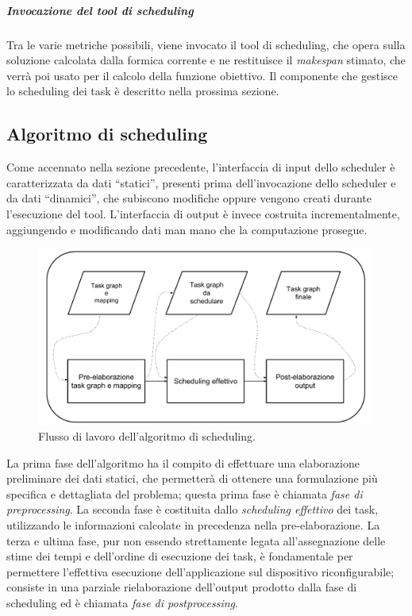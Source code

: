 \subparagraph{Invocazione del tool di scheduling}
Tra le varie metriche possibili, viene invocato il tool di scheduling, che opera sulla
soluzione calcolata dalla formica corrente e ne restituisce il \emph{makespan} stimato,
che verr\`a poi usato per il calcolo della funzione obiettivo. Il componente che gestisce lo scheduling
dei task \`e descritto nella prossima sezione.

\subsection{Algoritmo di scheduling}
\label{subsec:algoScheduling}
Come accennato nella sezione precedente, l'interfaccia di input dello scheduler è 
caratterizzata da dati ``statici'', presenti prima dell'invocazione dello 
scheduler e da dati ``dinamici'', che subiscono modifiche oppure vengono creati 
durante l'esecuzione del tool. L'interfaccia di output è invece costruita 
incrementalmente, aggiungendo e modificando dati man mano che la computazione 
prosegue.


\begin{figure}[ht]
 \begin{center}
\includegraphics[width=\textwidth]
{capitoli/figure/cap4/SchedulerWorkflow.pdf}
  \caption{Flusso di lavoro dell'algoritmo di scheduling.}
  \label{fig:schedulerWorkflow}
 \end{center}
\end{figure}


La prima fase dell'algoritmo ha il compito di 
effettuare una elaborazione preliminare dei dati statici, che permetterà di 
ottenere una formulazione più specifica e dettagliata del problema; questa 
prima fase è chiamata \emph{fase di preprocessing}. La seconda fase è 
costituita dallo \emph{scheduling effettivo} dei task, utilizzando le 
informazioni calcolate in precedenza nella pre-elaborazione. La terza e ultima 
fase, pur non essendo strettamente legata all'assegnazione delle stime dei tempi 
e dell'ordine di esecuzione dei task, è fondamentale per permettere l'effettiva 
esecuzione dell'applicazione sul dispositivo riconfigurabile; consiste in una 
parziale rielaborazione dell'output prodotto dalla fase di scheduling ed è 
chiamata \emph{fase di postprocessing}.

